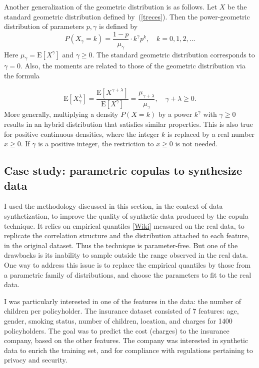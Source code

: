 \documentclass[oneside,10pt]{book}
\begin{document}
Another generalization of the geometric distribution is as follows. Let $X$ be the standard geometric distribution defined by~(\ref{treces}). Then the \textcolor{index}{power-geometric distribution} of parameters $p,\gamma$ is defined by
$$P(X_\gamma=k) = \frac{1-p}{\mu_\gamma}\cdot k^\gamma p^k, \quad k=0,1,2,\dots$$
Here $\mu_\gamma = \text{E}[X^\gamma]$ and $\gamma\geq 0$.
The standard
 geometric distribution corresponds to $\gamma=0$.
 Also, the moments are related to those of the geometric distribution via the formula

$$\text{E}[X_\gamma^\lambda] = \frac{\text{E}[X^{\gamma+\lambda}]}{\text{E}[X^\gamma]}=\frac{\mu_{\gamma+\lambda}}{\mu_{\gamma}}, \quad \gamma+\lambda \geq 0.$$
More generally, multiplying a density $P(X =k)$ by a power $k^\gamma$ with $\gamma\geq 0$ results in an hybrid distribution that satisfies similar properties. This is also true for positive continuous densities, where the integer $k$ is replaced by a real number $x\geq 0$.
If $\gamma$ is a positive integer, the restriction to $x\geq 0$ is not needed.


\subsection{Case study: parametric copulas to synthesize data}

I used the methodology discussed in this section, in the context of data synthetization, to improve the quality of
\textcolor{index}{synthetic data} produced by the copula technique. It relies on \textcolor{index}{empirical quantiles} [\href{https://en.wikipedia.org/wiki/Quantile_function}{Wiki}] measured on the real data, to replicate the correlation structure and the distribution attached to each feature, in the original dataset. Thus the technique is parameter-free. But one of the drawbacks is its inability to sample outside
 the range observed in the real data.
One way to address this issue is to replace the empirical quantiles by those from a parametric family of distributions, and choose the
 parameters to fit to the real data.

I was particularly interested in one of the features in the data: the number of children per policyholder. The insurance dataset consisted of 7 features: age, gender, smoking status, number of children, location, and charges for 1400
 policyholders. The goal was to predict the cost (charges) to the insurance company, based on the other features. The company was interested in synthetic data to enrich the training set, and for compliance with regulations
 pertaining to privacy and security.
\end{document}
